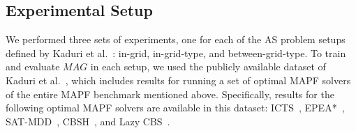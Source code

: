 \documentclass[letterpaper]{article} %
\newcommand{\shortcite}[1]{\cite{#1}}
\newcommand{\mapfgas}[1]{\ensuremath{\textit{MAG}}\xspace}
\begin{document}
\subsection{Experimental Setup}

We performed three sets of experiments, one for each of the AS problem setups defined by Kaduri et al.~\cite{kaduri2021experimental}: in-grid, in-grid-type, and between-grid-type. 
To train and evaluate \mapfgas\ in each setup, we used the publicly available dataset of Kaduri et al.~\shortcite{kaduri2021experimental}, 
which includes results for running a set of optimal MAPF solvers of the entire MAPF benchmark mentioned above. 
Specifically, results for the following optimal MAPF solvers are available in this dataset: ICTS~\cite{sharon2013increasing}, EPEA*~\cite{goldenberg2014enhanced}, SAT-MDD~\cite{surynek2016efficient}, CBSH~\cite{felner2018adding}, and Lazy CBS~\cite{gange2019lazy}. 
\end{document}
